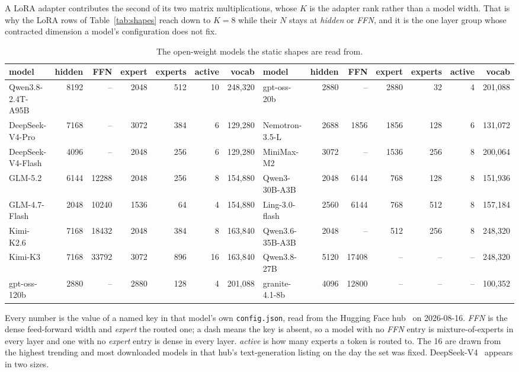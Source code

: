 \documentclass[sigplan,nonacm]{acmart}
\begin{document}
A LoRA adapter contributes the second of its two matrix multiplications, whose
$K$ is the adapter rank rather than a model width. That is why the LoRA rows of
Table~\ref{tab:shapes} reach down to $K = 8$ while their $N$ stays at
\emph{hidden} or \emph{FFN}, and it is the one layer group whose contracted
dimension a model's configuration does not fix.

\begin{table}[t]
  \centering
  \caption{The open-weight models the static shapes are read from.}
  \label{tab:models}
  \footnotesize
  \setlength{\tabcolsep}{3pt}
  \begin{tabular}{lrrrrrr@{\hskip 1.2em}lrrrrrr}
    \toprule
    model & hidden & FFN & expert & experts & active & vocab &
    model & hidden & FFN & expert & experts & active & vocab \\
    \midrule
    Qwen3.8-2.4T-A95B & 8192 & --    & 2048 & 512 & 10 & 248,320 &
    gpt-oss-20b       & 2880 & --    & 2880 &  32 &  4 & 201,088 \\
    DeepSeek-V4-Pro   & 7168 & --    & 3072 & 384 &  6 & 129,280 &
    Nemotron-3.5-L    & 2688 & 1856  & 1856 & 128 &  6 & 131,072 \\
    DeepSeek-V4-Flash & 4096 & --    & 2048 & 256 &  6 & 129,280 &
    MiniMax-M2        & 3072 & --    & 1536 & 256 &  8 & 200,064 \\
    GLM-5.2           & 6144 & 12288 & 2048 & 256 &  8 & 154,880 &
    Qwen3-30B-A3B     & 2048 & 6144  &  768 & 128 &  8 & 151,936 \\
    GLM-4.7-Flash     & 2048 & 10240 & 1536 &  64 &  4 & 154,880 &
    Ling-3.0-flash    & 2560 & 6144  &  768 & 512 &  8 & 157,184 \\
    Kimi-K2.6         & 7168 & 18432 & 2048 & 384 &  8 & 163,840 &
    Qwen3.6-35B-A3B   & 2048 & --    &  512 & 256 &  8 & 248,320 \\
    Kimi-K3           & 7168 & 33792 & 3072 & 896 & 16 & 163,840 &
    Qwen3.8-27B       & 5120 & 17408 & --   & --  & -- & 248,320 \\
    gpt-oss-120b      & 2880 & --    & 2880 & 128 &  4 & 201,088 &
    granite-4.1-8b    & 4096 & 12800 & --   & --  & -- & 100,352 \\
    \bottomrule
  \end{tabular}

  \vspace{2pt}
  \parbox{\textwidth}{\footnotesize Every number is the value of a named key in that
  model's own \texttt{config.json}, read from the Hugging Face
  hub~\cite{huggingface_hub} on 2026-08-16. \emph{FFN} is the dense feed-forward width
  and \emph{expert} the routed one; a dash means the key is absent, so a model with no
  \emph{FFN} entry is mixture-of-experts in every layer and one with no \emph{expert}
  entry is dense in every layer. \emph{active} is how many experts a token is routed
  to. The 16 are drawn from the highest trending and most downloaded models in that
  hub's text-generation listing on the day the set was fixed.
  DeepSeek-V4~\cite{deepseekv4} appears in two sizes.}
\end{table}
\end{document}
